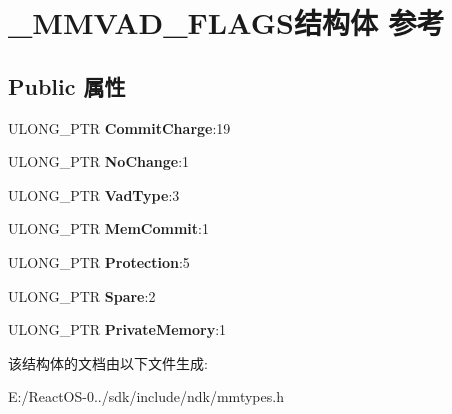 \hypertarget{struct___m_m_v_a_d___f_l_a_g_s}{}\section{\+\_\+\+M\+M\+V\+A\+D\+\_\+\+F\+L\+A\+G\+S结构体 参考}
\label{struct___m_m_v_a_d___f_l_a_g_s}
\subsection*{Public 属性}
\begin{DoxyCompactItemize}
\item 
\mbox{\label{struct___m_m_v_a_d___f_l_a_g_s_a74be13ee72ded1dbe43b58b90b870355}} 
U\+L\+O\+N\+G\+\_\+\+P\+TR {\bfseries Commit\+Charge}\+:19
\item 
\mbox{\label{struct___m_m_v_a_d___f_l_a_g_s_a01e1d482ee00d46c1610959d6a5a5a9b}} 
U\+L\+O\+N\+G\+\_\+\+P\+TR {\bfseries No\+Change}\+:1
\item 
\mbox{\label{struct___m_m_v_a_d___f_l_a_g_s_aca88e2c8e69a676691bd3a8ca1e28d39}} 
U\+L\+O\+N\+G\+\_\+\+P\+TR {\bfseries Vad\+Type}\+:3
\item 
\mbox{\label{struct___m_m_v_a_d___f_l_a_g_s_a166a3ce21a220389993d127f2800dbcb}} 
U\+L\+O\+N\+G\+\_\+\+P\+TR {\bfseries Mem\+Commit}\+:1
\item 
\mbox{\label{struct___m_m_v_a_d___f_l_a_g_s_a723c99484efdffad1869c76a88cbd176}} 
U\+L\+O\+N\+G\+\_\+\+P\+TR {\bfseries Protection}\+:5
\item 
\mbox{\label{struct___m_m_v_a_d___f_l_a_g_s_a987ba321477ee9113e80840bf58c3202}} 
U\+L\+O\+N\+G\+\_\+\+P\+TR {\bfseries Spare}\+:2
\item 
\mbox{\label{struct___m_m_v_a_d___f_l_a_g_s_ad7e34fc55b73dc7247960132c4b35611}} 
U\+L\+O\+N\+G\+\_\+\+P\+TR {\bfseries Private\+Memory}\+:1
\end{DoxyCompactItemize}


该结构体的文档由以下文件生成\+:\begin{DoxyCompactItemize}
\item 
E\+:/\+React\+O\+S-\/0../sdk/include/ndk/mmtypes.\+h\end{DoxyCompactItemize}
